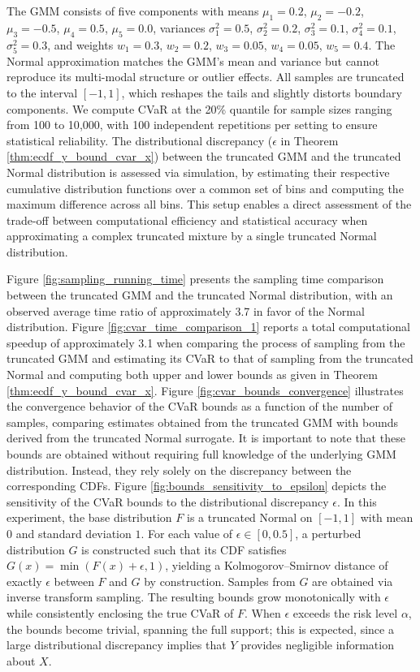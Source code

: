 \documentclass[acmlarge, manuscript, screen, review, natbib=false, oneside]{acmart}
\begin{document}
The GMM consists of five components with means $\mu_1 = 0.2$, $\mu_2 = -0.2$, $\mu_3 = -0.5$, $\mu_4 = 0.5$, $\mu_5 = 0.0$, variances $\sigma_1^2 = 0.5$, $\sigma_2^2 = 0.2$, $\sigma_3^2 = 0.1$, $\sigma_4^2 = 0.1$, $\sigma_5^2 = 0.3$, and weights $w_1 = 0.3$, $w_2 = 0.2$, $w_3 = 0.05$, $w_4 = 0.05$, $w_5 = 0.4$. The Normal approximation matches the GMM's mean and variance but cannot reproduce its multi-modal structure or outlier effects. All samples are truncated to the interval $[-1, 1]$, which reshapes the tails and slightly distorts boundary components. We compute CVaR at the 20\% quantile for sample sizes ranging from 100 to 10{,}000, with 100 independent repetitions per setting to ensure statistical reliability. The distributional discrepancy ($\epsilon$ in Theorem \ref{thm:ecdf_y_bound_cvar_x}) between the truncated GMM and the truncated Normal distribution is assessed via simulation, by estimating their respective cumulative distribution functions over a common set of bins and computing the maximum difference across all bins. This setup enables a direct assessment of the trade-off between computational efficiency and statistical accuracy when approximating a complex truncated mixture by a single truncated Normal distribution.

Figure \ref{fig:sampling_running_time} presents the sampling time comparison between the truncated GMM and the truncated Normal distribution, with an observed average time ratio of approximately 3.7 in favor of the Normal distribution. Figure \ref{fig:cvar_time_comparison_1} reports a total computational speedup of approximately 3.1 when comparing the process of sampling from the truncated GMM and estimating its CVaR to that of sampling from the truncated Normal and computing both upper and lower bounds as given in Theorem \ref{thm:ecdf_y_bound_cvar_x}. Figure \ref{fig:cvar_bounds_convergence} illustrates the convergence behavior of the CVaR bounds as a function of the number of samples, comparing estimates obtained from the truncated GMM with bounds derived from the truncated Normal surrogate. It is important to note that these bounds are obtained without requiring full knowledge of the underlying GMM distribution. Instead, they rely solely on the discrepancy between the corresponding CDFs. Figure \ref{fig:bounds_sensitivity_to_epsilon} depicts the sensitivity of the CVaR bounds to the distributional discrepancy $\epsilon$. In this experiment, the base distribution $F$ is a truncated Normal on $[-1,1]$ with mean $0$ and standard deviation $1$. For each value of $\epsilon \in [0, 0.5]$, a perturbed distribution $G$ is constructed such that its CDF satisfies $G(x) = \min(F(x) + \epsilon, 1)$, yielding a Kolmogorov--Smirnov distance of exactly $\epsilon$ between $F$ and $G$ by construction. Samples from $G$ are obtained via inverse transform sampling. The resulting bounds grow monotonically with $\epsilon$ while consistently enclosing the true CVaR of $F$. When $\epsilon$ exceeds the risk level $\alpha$, the bounds become trivial, spanning the full support; this is expected, since a large distributional discrepancy implies that $Y$ provides negligible information about $X$.
\end{document}
